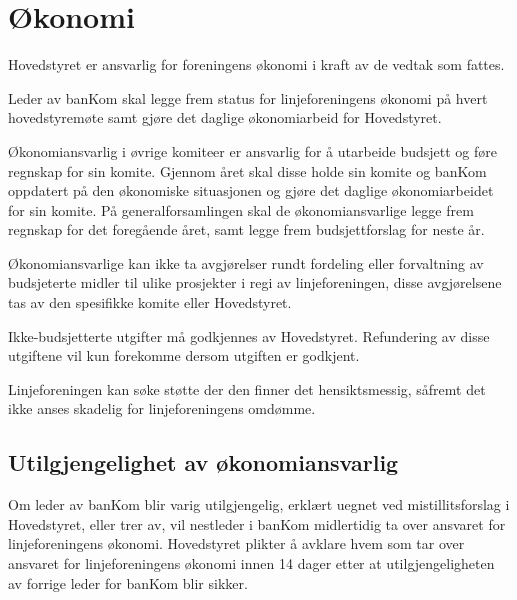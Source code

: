 \chapter{Økonomi}
\label{chap:okonomi}
Hovedstyret er ansvarlig for foreningens økonomi i kraft av de vedtak som fattes. \newline

Leder av banKom skal legge frem status for linjeforeningens økonomi på hvert \linebreak hovedstyremøte samt gjøre det daglige økonomiarbeid for Hovedstyret.\newline

Økonomiansvarlig i øvrige komiteer er ansvarlig for å utarbeide budsjett og føre regnskap for sin komite. Gjennom året skal disse holde sin komite og banKom oppdatert på den økonomiske situasjonen og gjøre det daglige økonomiarbeidet for sin komite. På generalforsamlingen skal de økonomiansvarlige legge frem regnskap for det foregående året, samt legge frem budsjettforslag for neste år.\newline

Økonomiansvarlige kan ikke ta avgjørelser rundt fordeling eller forvaltning av \linebreak budsjeterte midler til ulike prosjekter i regi av linjeforeningen, disse avgjørelsene tas av den spesifikke komite eller Hovedstyret.\newline

Ikke-budsjetterte utgifter må godkjennes av Hovedstyret. Refundering av disse \linebreak utgiftene vil kun forekomme dersom utgiften er godkjent.\newline

Linjeforeningen kan søke støtte der den finner det hensiktsmessig, såfremt det ikke anses skadelig for linjeforeningens omdømme.\newline

\section{Utilgjengelighet av økonomiansvarlig}

Om leder av banKom blir varig utilgjengelig, erklært uegnet ved mistillitsforslag i Hovedstyret, eller trer av, vil nestleder i banKom midlertidig ta over ansvaret for linjeforeningens økonomi. Hovedstyret plikter å avklare hvem som tar over ansvaret for linjeforeningens økonomi innen 14 dager etter at utilgjengeligheten av forrige leder for banKom blir sikker. 